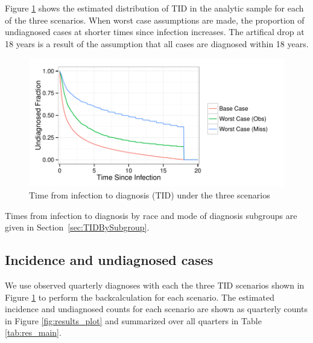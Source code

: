 \documentclass{article}\usepackage[]{graphicx}\usepackage[]{color}
\makeatletter
\def\maxwidth{ %
  \ifdim\Gin@nat@width>\linewidth
    \linewidth
  \else
    \Gin@nat@width
  \fi
}
\newenvironment{knitrout}{}{} %
\makeatother
\begin{document}
Figure \ref{fig:plot_newfig1} shows the estimated distribution of TID in the analytic sample for each of the three scenarios. When worst case assumptions are made, the proportion of undiagnosed cases at shorter times since infection increases. The artifical drop at 18 years is a result of the assumption that all cases are diagnosed within 18 years.


\begin{knitrout}\footnotesize
{}\color{fgcolor}\begin{figure}[!h]


{\centering \includegraphics[width=\maxwidth]{figure/minimal-plot_newfig1} 

}

\caption[Time from infection to diagnosis (TID) under the three scenarios]{Time from infection to diagnosis (TID) under the three scenarios\label{fig:plot_newfig1}}
\end{figure}


\end{knitrout}

Times from infection to diagnosis by race and mode of diagnosis subgroups are given in Section~\ref{sec:TIDBySubgroup}.

\subsection{Incidence and undiagnosed cases}

We use observed quarterly diagnoses with each the three TID scenarios shown in Figure \ref{fig:plot_newfig1} to perform the backcalculation for each scenario. The estimated incidence and undiagnosed counts for each scenario are shown as quarterly counts in Figure \ref{fig:results_plot} and summarized over all quarters in Table \ref{tab:res_main}.
\end{document}
